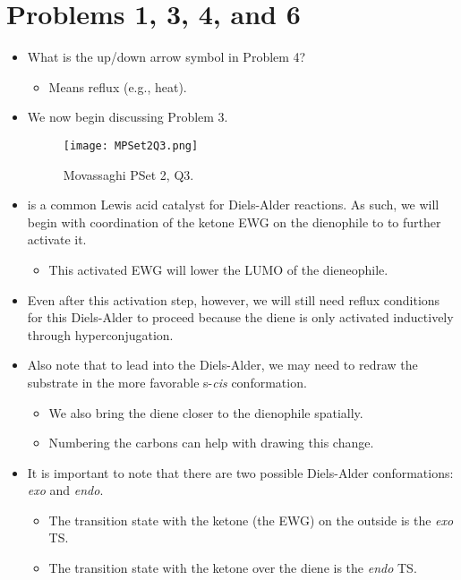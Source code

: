 \documentclass[../notes.tex]{subfiles}
\begin{document}
\section{Problems 1, 3, 4, and 6}
\begin{itemize}
    \item {}What is the up/down arrow symbol in Problem 4?
    \begin{itemize}
        \item Means reflux (e.g., heat).
    \end{itemize}
    \item We now begin discussing Problem 3.
    \begin{figure}[h!]
        \centering
        \texttt{[image: MPSet2Q3.png]}
        \caption{Movassaghi PSet 2, Q3.}
        \label{fig:MPSet2Q3}
    \end{figure}
    \item {} is a common Lewis acid catalyst for Diels-Alder reactions. As such, we will begin with coordination of the ketone EWG on the dienophile to  to further activate it.
    \begin{itemize}
        \item This activated EWG will lower the LUMO of the dieneophile.
    \end{itemize}
    \item Even after this activation step, however, we will still need reflux conditions for this Diels-Alder to proceed because the diene is only activated inductively through hyperconjugation.
    \item Also note that to lead into the Diels-Alder, we may need to redraw the substrate in the more favorable s-\emph{cis} conformation.
    \begin{itemize}
        \item We also bring the diene closer to the dienophile spatially.
        \item Numbering the carbons can help with drawing this change.
    \end{itemize}
    \item It is important to note that there are two possible Diels-Alder conformations: \emph{exo} and \emph{endo}.
    \begin{itemize}
        \item The transition state with the ketone (the EWG) on the outside is the \emph{exo} TS.
        \item The transition state with the ketone over the diene is the \emph{endo} TS.

\end{itemize}
\end{itemize}
\end{document}
